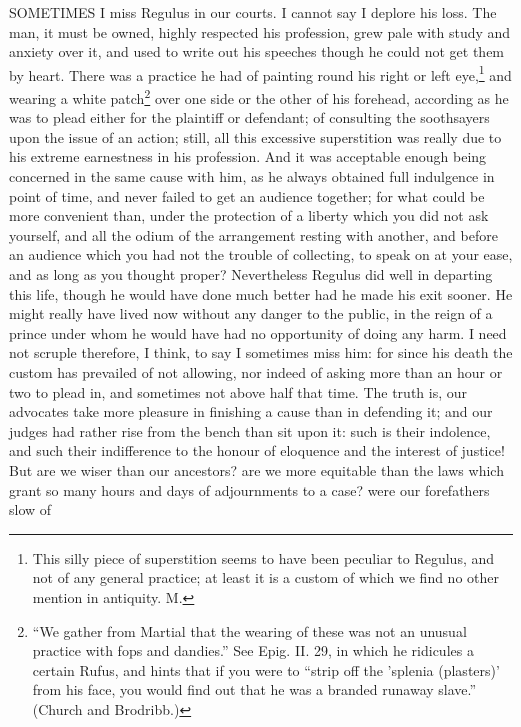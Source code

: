 
SOMETIMES I miss Regulus in our courts. I cannot say I deplore his loss.
The man, it must be owned, highly respected his profession, grew pale with
study and anxiety over it, and used to write out his speeches though he
could not get them by heart. There was a practice he had of painting round
his right or left eye,\footnote{This silly piece of
superstition seems to have been peculiar to Regulus, and not of any
general practice; at least it is a custom of which we find no other
mention in antiquity. M.} and wearing a white patch\footnote{``We gather from Martial
that the wearing of these was not an unusual practice with fops and
dandies.'' See Epig. II. 29, in which he ridicules a certain Rufus, and
hints that if you were to ``strip off the 'splenia (plasters)' from his
face, you would find out that he was a branded runaway slave.'' (Church and
Brodribb.)}
over one side or the other of his forehead, according as he was to plead
either for the plaintiff or defendant; of consulting the soothsayers upon
the issue of an action; still, all this excessive superstition was really
due to his extreme earnestness in his profession. And it was acceptable
enough being concerned in the same cause with him, as he always obtained
full indulgence in point of time, and never failed to get an audience
together; for what could be more convenient than, under the protection of
a liberty which you did not ask yourself, and all the odium of the
arrangement resting with another, and before an audience which you had not
the trouble of collecting, to speak on at your ease, and as long as you
thought proper? Nevertheless Regulus did well in departing this life,
though he would have done much better had he made his exit sooner. He
might really have lived now without any danger to the public, in the reign
of a prince under whom he would have had no opportunity of doing any harm.
I need not scruple therefore, I think, to say I sometimes miss him: for
since his death the custom has prevailed of not allowing, nor indeed of
asking more than an hour or two to plead in, and sometimes not above half
that time. The truth is, our advocates take more pleasure in finishing a
cause than in defending it; and our judges had rather rise from the bench
than sit upon it: such is their indolence, and such their indifference to
the honour of eloquence and the interest of justice! But are we wiser than
our ancestors? are we more equitable than the laws which grant so many
hours and days of adjournments to a case? were our forefathers slow of
